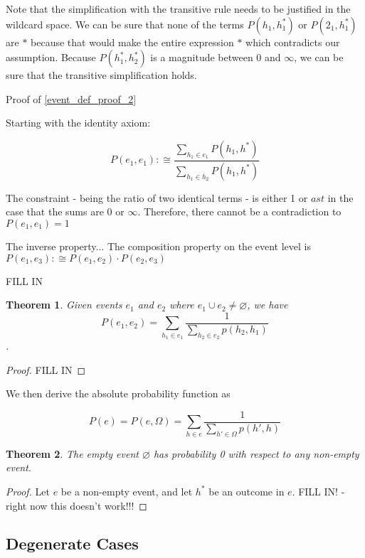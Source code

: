 \documentclass[twoside]{article}
\theoremstyle{plain}%
\newtheorem{theorem}{Theorem}[section]
\theoremstyle{definition}
\theoremstyle{remark}
\begin{document}
Note that the simplification with the transitive rule needs to be justified in the wildcard space. We can be sure that none of the terms \(P(h_1, h_1^*)\) or \( P(2_1, h_1^*)\) are \(\ast\) because that would make the entire expression \(\ast\) which contradicts our assumption. Because \(P(h_1^*, h_2^*)\) is a magnitude between 0 and \(\infty\), we can be sure that the transitive simplification holds.

Proof of \ref{event_def_proof_2}

Starting with the identity axiom:

\[P(e_1, e_1) :\cong \frac{\sum_{h_1 \in e_1} P(h_1, h^*)}{\sum_{h_1 \in h_2} P(h_1, h^*)}\]

The constraint - being the ratio of two identical terms - is either 1 or \(ast\) in the case that the sums are \(0\) or \(\infty\). Therefore, there cannot be a contradiction to \(P(e_1, e_1) = 1\)

The inverse property...
The composition property on the event level is \(P(e_1, e_3) :\cong P(e_1, e_2) \cdot P(e_2, e_3)\)

FILL IN

\begin{theorem}
Given events \(e_1\) and \(e_2\) where \(e_1 \cup e_2 \neq \varnothing\), we have \[P(e_1, e_2) = \sum_{h_1 \in e_1} \frac{1}{\sum_{h_2 \in e_2} p(h_2, h_1)}\].
\end{theorem}

\begin{proof}
FILL IN
\end{proof}

We then derive the absolute probability function as

\[P(e) = P(e, \Omega) = \sum_{h \in e} \frac{1}{\sum_{h' \in \Omega}p(h', h)}\]

\begin{theorem}
\label{theorem:empty_event_impossible}
The empty event \(\varnothing\) has probability 0 with respect to any non-empty event.
\end{theorem}

\begin{proof}
Let \(e\) be a non-empty event, and let \(h^*\) be an outcome in \(e\).
FILL IN! - right now this doesn't work!!!
\end{proof}

\subsection{Degenerate Cases}
\end{document}
